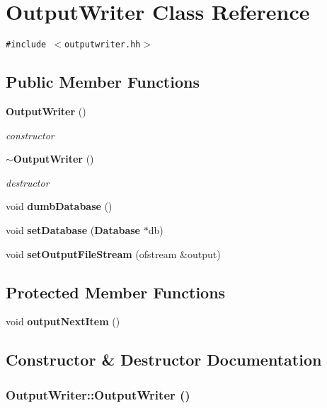 \section{OutputWriter Class Reference}
\label{classOutputWriter}
{\tt \#include $<$outputwriter.hh$>$}

\subsection*{Public Member Functions}
\begin{CompactItemize}
\item 
{\bf OutputWriter} ()
\begin{CompactList}\small\item\em constructor \item\end{CompactList}\item 
{\bf $\sim$OutputWriter} ()
\begin{CompactList}\small\item\em destructor \item\end{CompactList}\item 
void {\bf dumbDatabase} ()
\item 
void {\bf setDatabase} ({\bf Database} $\ast$db)
\item 
void {\bf setOutputFileStream} (ofstream \&output)
\end{CompactItemize}
\subsection*{Protected Member Functions}
\begin{CompactItemize}
\item 
void {\bf outputNextItem} ()
\end{CompactItemize}


\subsection{Constructor \& Destructor Documentation}
\subsubsection[OutputWriter]{\setlength{\rightskip}{0pt plus 5cm}OutputWriter::OutputWriter ()}\label{classOutputWriter_e4f43da005288c939e6471cc777c92ce}


